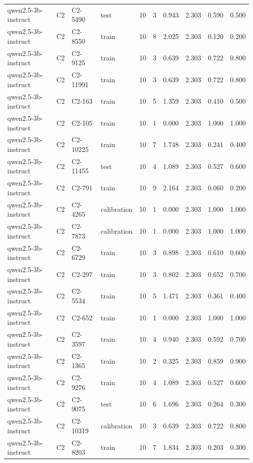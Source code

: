 \begin{table}
\begin{tabular}{llllrrrrrr}
qwen2.5-3b-instruct & C2 & C2-5490 & test & 10 & 3 & 0.943 & 2.303 & 0.590 & 0.500 \\
qwen2.5-3b-instruct & C2 & C2-8550 & train & 10 & 8 & 2.025 & 2.303 & 0.120 & 0.200 \\
qwen2.5-3b-instruct & C2 & C2-9125 & train & 10 & 3 & 0.639 & 2.303 & 0.722 & 0.800 \\
qwen2.5-3b-instruct & C2 & C2-11991 & train & 10 & 3 & 0.639 & 2.303 & 0.722 & 0.800 \\
qwen2.5-3b-instruct & C2 & C2-163 & train & 10 & 5 & 1.359 & 2.303 & 0.410 & 0.500 \\
qwen2.5-3b-instruct & C2 & C2-105 & train & 10 & 1 & 0.000 & 2.303 & 1.000 & 1.000 \\
qwen2.5-3b-instruct & C2 & C2-10225 & train & 10 & 7 & 1.748 & 2.303 & 0.241 & 0.400 \\
qwen2.5-3b-instruct & C2 & C2-11455 & test & 10 & 4 & 1.089 & 2.303 & 0.527 & 0.600 \\
qwen2.5-3b-instruct & C2 & C2-791 & train & 10 & 9 & 2.164 & 2.303 & 0.060 & 0.200 \\
qwen2.5-3b-instruct & C2 & C2-4265 & calibration & 10 & 1 & 0.000 & 2.303 & 1.000 & 1.000 \\
qwen2.5-3b-instruct & C2 & C2-7873 & calibration & 10 & 1 & 0.000 & 2.303 & 1.000 & 1.000 \\
qwen2.5-3b-instruct & C2 & C2-6729 & train & 10 & 3 & 0.898 & 2.303 & 0.610 & 0.600 \\
qwen2.5-3b-instruct & C2 & C2-297 & train & 10 & 3 & 0.802 & 2.303 & 0.652 & 0.700 \\
qwen2.5-3b-instruct & C2 & C2-5534 & train & 10 & 5 & 1.471 & 2.303 & 0.361 & 0.400 \\
qwen2.5-3b-instruct & C2 & C2-652 & train & 10 & 1 & 0.000 & 2.303 & 1.000 & 1.000 \\
qwen2.5-3b-instruct & C2 & C2-3597 & train & 10 & 4 & 0.940 & 2.303 & 0.592 & 0.700 \\
qwen2.5-3b-instruct & C2 & C2-1365 & train & 10 & 2 & 0.325 & 2.303 & 0.859 & 0.900 \\
qwen2.5-3b-instruct & C2 & C2-9276 & train & 10 & 4 & 1.089 & 2.303 & 0.527 & 0.600 \\
qwen2.5-3b-instruct & C2 & C2-9075 & test & 10 & 6 & 1.696 & 2.303 & 0.264 & 0.300 \\
qwen2.5-3b-instruct & C2 & C2-10319 & calibration & 10 & 3 & 0.639 & 2.303 & 0.722 & 0.800 \\
qwen2.5-3b-instruct & C2 & C2-8203 & train & 10 & 7 & 1.834 & 2.303 & 0.203 & 0.300 \\

\end{tabular}
\end{table}
